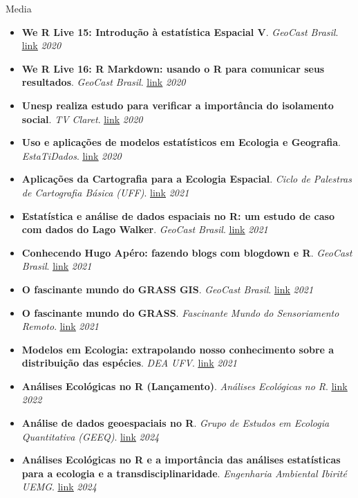 \documentclass{resume}
\begin{document}
\begin{rSection}{Media}
\begin{itemize}
\item {\bf We R Live 15: Introdução à estatística Espacial V}. {\it GeoCast Brasil}. \href{https://youtu.be/IeGTr7mjZIc}{\underline{link}} \hfill{\em 2020}
\item {\bf We R Live 16: R Markdown: usando o R para comunicar seus resultados}. {\it GeoCast Brasil}. \href{https://youtu.be/6oPZ5sGt6LA}{\underline{link}} \hfill{\em 2020}
\item {\bf Unesp realiza estudo para verificar a importância do isolamento social}. {\it TV Claret}. \href{https://youtu.be/RP6rUQpberE}{\underline{link}} \hfill{\em 2020}
\item {\bf Uso e aplicações de modelos estatísticos em Ecologia e Geografia}. {\it EstaTiDados}. \href{https://youtu.be/pUavO7dVRGk}{\underline{link}} \hfill{\em 2020}
\item {\bf Aplicações da Cartografia para a Ecologia Espacial}. {\it Ciclo de Palestras de Cartografia Básica (UFF)}. \href{https://youtu.be/csh1BPH_H8I}{\underline{link}} \hfill{\em 2021}
\item {\bf Estatística e análise de dados espaciais no R: um estudo de caso com dados do Lago Walker}. {\it GeoCast Brasil}. \href{https://youtu.be/csh1BPH_H8I}{\underline{link}} \hfill{\em 2021}
\item {\bf Conhecendo Hugo Apéro: fazendo blogs com blogdown e R}. {\it GeoCast Brasil}. \href{https://youtu.be/4Ixl2RjZEYI}{\underline{link}} \hfill{\em 2021}
\item {\bf O fascinante mundo do GRASS GIS}. {\it GeoCast Brasil}. \href{https://youtu.be/_pohWjE4eiA}{\underline{link}} \hfill{\em 2021}
\item {\bf O fascinante mundo do GRASS}. {\it Fascinante Mundo do Sensoriamento Remoto}. \href{https://youtu.be/vp6frd89y9E}{\underline{link}} \hfill{\em 2021}
\item {\bf Modelos em Ecologia: extrapolando nosso conhecimento sobre a distribuição das espécies}. {\it DEA UFV}. \href{https://youtu.be/Kcc-eIhqtlE}{\underline{link}} \hfill{\em 2021}
\item {\bf Análises Ecológicas no R (Lançamento)}. {\it Análises Ecológicas no R}. \href{https://youtu.be/jYrneB95nes}{\underline{link}} \hfill{\em 2022}
\item {\bf Análise de dados geoespaciais no R}. {\it Grupo de Estudos em Ecologia Quantitativa (GEEQ)}. \href{https://youtu.be/qySBvCu7IS0}{\underline{link}} \hfill{\em 2024}	
\item {\bf Análises Ecológicas no R e a importância das análises estatísticas para a ecologia e a transdisciplinaridade}. {\it Engenharia Ambiental Ibirité UEMG}. \href{https://www.youtube.com/watch?v=NWfJ5G2w8ME}{\underline{link}} \hfill{\em 2024}
\end{itemize} 


\end{rSection}
\end{document}
